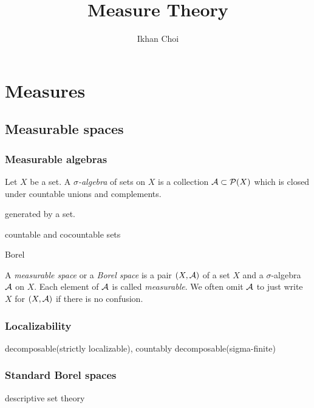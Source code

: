 \documentclass{../../large}
\begin{document}
\title{Measure Theory}
\author{Ikhan Choi}
\maketitle
\tableofcontents

\part{Measures}


\chapter{Measurable spaces}


\section{Measurable algebras}

\begin{prb}
Let $X$ be a set.
A \emph{$\sigma$-algebra} of sets on $X$ is a collection $\mathcal{A}\subset\mathcal{P}(X)$ which is closed under countable unions and complements.
\begin{parts}
\item generated by a set.
\item countable and cocountable sets
\item Borel
\end{parts}
\end{prb}

\begin{prb}
A \emph{measurable space} or a \emph{Borel space} is a pair $(X,\mathcal{A})$ of a set $X$ and a $\sigma$-algebra $\mathcal{A}$ on $X$.
Each element of $\mathcal{A}$ is called \emph{measurable}.
We often omit $\mathcal{A}$ to just write $X$ for $(X,\mathcal{A})$ if there is no confusion.
\end{prb}

\section{Localizability}

decomposable(strictly localizable), countably decomposable(sigma-finite)

\section{Standard Borel spaces}

descriptive set theory
\end{document}
